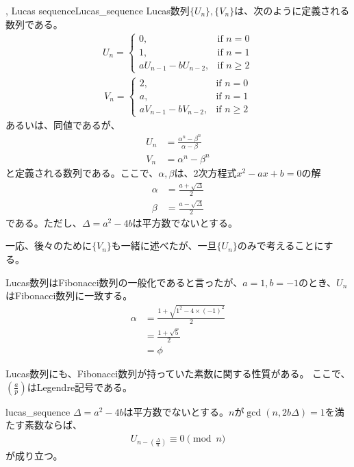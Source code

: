 \begin{Defi}{, Lucas sequence}{Lucas_sequence}
Lucas数列$\{U_n\},\{V_n\}$は、次のように定義される数列である。
\begin{align*}
U_n =
\begin{cases}
0, &\mbox{if } n = 0\\
1, &\mbox{if } n = 1\\
aU_{n - 1} - bU_{n - 2}, &\mbox{if } n \ge 2
\end{cases}
\end{align*}
\begin{align*}
V_n =
\begin{cases}
2, &\mbox{if } n = 0\\
a, &\mbox{if } n = 1\\
aV_{n - 1} - bV_{n - 2}, &\mbox{if } n \ge 2
\end{cases}
\end{align*}
あるいは、同値であるが、
\begin{align*}
U_n &= \frac{\alpha^n - \beta^n}{\alpha - \beta}\\
V_n &= \alpha^n - \beta^n
\end{align*}
と定義される数列である。ここで、$\alpha, \beta$は、2次方程式$x^2-ax+b=0$の解
\begin{align*}
\alpha &= \frac{a+\sqrt{\Delta}}{2}\\
\beta &= \frac{a-\sqrt{\Delta}}{2}
\end{align*}
である。ただし、$\Delta=a^2 - 4b$は平方数でないとする。
\end{Defi}

一応、後々のために$\{V_n\}$も一緒に述べたが、一旦$\{U_n\}$のみで考えることにする。


Lucas数列はFibonacci数列の一般化であると言ったが、$a=1, b=-1$のとき、$U_n$はFibonacci数列に一致する。
\begin{align*}
\alpha &= \frac{1 + \sqrt{1^2 - 4 \times (-1)^2}}{2}\\
&= \frac{1 + \sqrt{5}}{2}\\
&= \phi
\end{align*}

Lucas数列にも、Fibonacci数列が持っていた素数に関する性質がある。
ここで、$\left(\frac{a}{p}\right)$はLegendre記号である。

\begin{Theo}{}{lucas_sequence}
$\Delta=a^2-4b$は平方数でないとする。$n$が$\gcd(n, 2b\Delta)=1$を満たす素数ならば、
\begin{align*}
U_{n - \left(\frac{\Delta}{n}\right)} \equiv 0 \pmod{n}
\end{align*}
が成り立つ。
\end{Theo}

